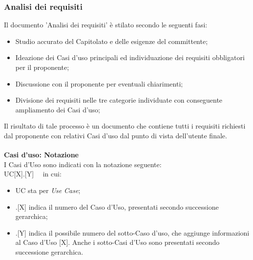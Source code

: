 \documentclass[10pt, a4paper]{article}
\begin{document}
\subsubsection{Analisi dei requisiti}
Il documento 'Analisi dei requisiti' è stilato secondo le seguenti fasi:
\begin{itemize}
    \item Studio accurato del Capitolato e delle esigenze del committente;
    \item Ideazione dei Casi d'uso principali ed individuazione dei requisiti obbligatori per il proponente;
    \item Discussione con il proponente per eventuali chiarimenti;
    \item Divisione dei requisiti nelle tre categorie individuate con conseguente ampliamento dei Casi d'uso;
\end{itemize}
Il risultato di tale processo è un documento che contiene
tutti i requisiti richiesti dal proponente con relativi Casi d'uso dal punto di vista dell'utente finale.
\\\\
\textbf{Casi d'uso: Notazione}\\
I Casi d'Uso sono indicati con la notazione seguente: \\ UC[X].[Y] \ \  in cui:
\begin{itemize}
\item UC sta per \textit{Use Case};
\item .[X] indica il numero del Caso d'Uso, presentati secondo successione gerarchica;
\item .[Y] indica il possibile numero del sotto-Caso d'uso, che aggiunge informazioni al Caso d'Uso [X]. Anche i sotto-Casi d'Uso sono presentati secondo successione gerarchica.\\
\end{itemize}
\end{document}
